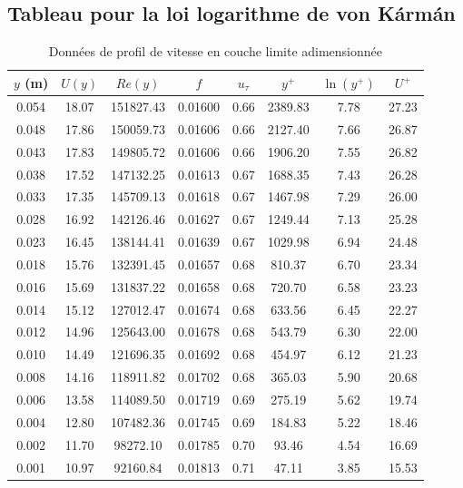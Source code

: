 \documentclass[12pt, a4paper]{report}
\begin{document}
	\subsection{Tableau pour la loi logarithme de von Kármán}
	\vspace{-2em}
	\begin{table}[h]
		\centering
		\small
		\begin{tabular}{cc|ccc|ccc}
			\toprule
			{$y$ (m)} & {$U(y)$} & {$Re(y)$} & {$f$} & {$u_\tau$} & {$y^+$} & {$\ln(y^+)$} & {$U^+$} \\
			\midrule
			0.054 & 18.07 & 151827.43 & 0.01600 & 0.66 & 2389.83 & 7.78 & 27.23 \\
			0.048 & 17.86 & 150059.73 & 0.01606 & 0.66 & 2127.40 & 7.66 & 26.87 \\
			0.043 & 17.83 & 149805.72 & 0.01606 & 0.66 & 1906.20 & 7.55 & 26.82 \\
			0.038 & 17.52 & 147132.25 & 0.01613 & 0.67 & 1688.35 & 7.43 & 26.28 \\
			0.033 & 17.35 & 145709.13 & 0.01618 & 0.67 & 1467.98 & 7.29 & 26.00 \\
			0.028 & 16.92 & 142126.46 & 0.01627 & 0.67 & 1249.44 & 7.13 & 25.28 \\
			0.023 & 16.45 & 138144.41 & 0.01639 & 0.67 & 1029.98 & 6.94 & 24.48 \\
			0.018 & 15.76 & 132391.45 & 0.01657 & 0.68 & 810.37 & 6.70 & 23.34 \\
			0.016 & 15.69 & 131837.22 & 0.01658 & 0.68 & 720.70 & 6.58 & 23.23 \\
			0.014 & 15.12 & 127012.47 & 0.01674 & 0.68 & 633.56 & 6.45 & 22.27 \\
			0.012 & 14.96 & 125643.00 & 0.01678 & 0.68 & 543.79 & 6.30 & 22.00 \\
			0.010 & 14.49 & 121696.35 & 0.01692 & 0.68 & 454.97 & 6.12 & 21.23 \\
			0.008 & 14.16 & 118911.82 & 0.01702 & 0.68 & 365.03 & 5.90 & 20.68 \\
			0.006 & 13.58 & 114089.50 & 0.01719 & 0.69 & 275.19 & 5.62 & 19.74 \\
			0.004 & 12.80 & 107482.36 & 0.01745 & 0.69 & 184.83 & 5.22 & 18.46 \\
			0.002 & 11.70 & 98272.10  & 0.01785 & 0.70 & 93.46  & 4.54 & 16.69 \\
			0.001 & 10.97 & 92160.84  & 0.01813 & 0.71 & 47.11  & 3.85 & 15.53 \\
			\bottomrule
		\end{tabular}
		\caption{Données de profil de vitesse en couche limite adimensionnée}
	\end{table}
	
\end{document}
